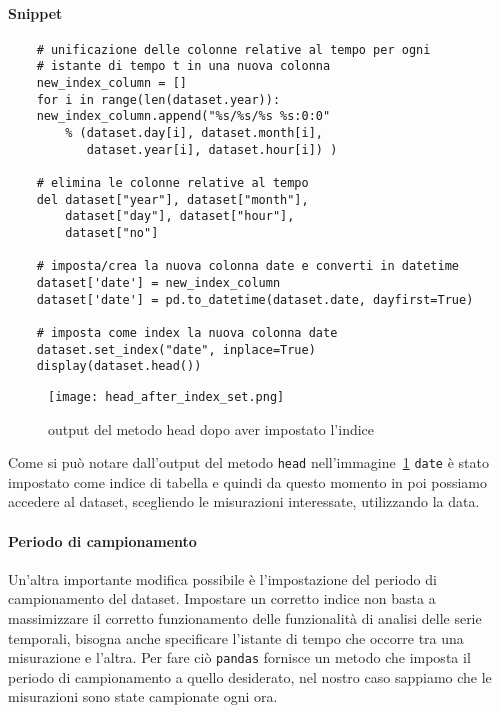 \paragraph{Snippet}
\begin{verbatim}
    # unificazione delle colonne relative al tempo per ogni 
    # istante di tempo t in una nuova colonna
    new_index_column = []
    for i in range(len(dataset.year)):
    new_index_column.append("%s/%s/%s %s:0:0" 
        % (dataset.day[i], dataset.month[i], 
           dataset.year[i], dataset.hour[i]) )

    # elimina le colonne relative al tempo
    del dataset["year"], dataset["month"], 
        dataset["day"], dataset["hour"], 
        dataset["no"]

    # imposta/crea la nuova colonna date e converti in datetime
    dataset['date'] = new_index_column
    dataset['date'] = pd.to_datetime(dataset.date, dayfirst=True)

    # imposta come index la nuova colonna date
    dataset.set_index("date", inplace=True)
    display(dataset.head())
\end{verbatim}

\begin{figure}[H]
    \texttt{[image: head\_after\_index\_set.png]}
    \caption{output del metodo head dopo aver impostato l'indice}
    \label{fig:head_after_index_set}
\end{figure}

Come si può notare dall'output del metodo \texttt{head} nell'immagine~\ref*{fig:head_after_index_set}
\texttt{date} è stato impostato come indice di tabella e quindi da questo momento in poi
possiamo accedere al dataset, scegliendo le misurazioni interessate, utilizzando la
data.

\paragraph{Periodo di campionamento}
\begin{sloppypar}   
Un'altra importante modifica possibile è l'impostazione del periodo di campionamento del dataset.
Impostare un corretto indice non basta a massimizzare il corretto
funzionamento delle funzionalità di analisi delle serie temporali, bisogna anche specificare
l'istante di tempo che occorre tra una misurazione e l'altra. Per fare ciò
\texttt{pandas} fornisce un metodo che imposta il periodo di campionamento
a quello desiderato, nel nostro caso sappiamo che le misurazioni sono state campionate
ogni ora.
\end{sloppypar}

